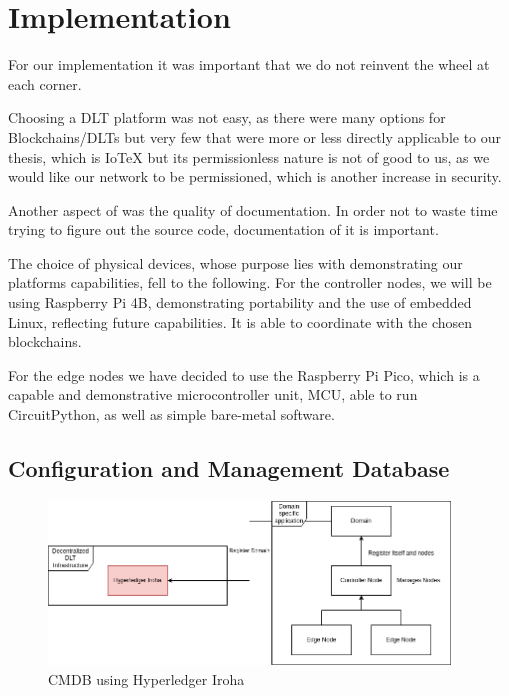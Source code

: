 \chapter{Implementation}

For our implementation it was important that we do not reinvent the wheel at each corner.

Choosing a DLT platform was not easy, as there were many options for Blockchains/DLTs but very few that were more or
less directly applicable to our thesis, which is IoTeX but its permissionless nature is not of good to us, as we would
like our network to be permissioned, which is another increase in security.

Another aspect of was the quality of documentation. In order not to waste time trying to figure out the source code,
documentation of it is important.

The choice of physical devices, whose purpose lies with demonstrating our platforms capabilities, fell to the following.
For the controller nodes, we will be using Raspberry Pi 4B, demonstrating portability and the use of embedded Linux,
reflecting future capabilities. It is able to coordinate with the chosen blockchains.

For the edge nodes we have decided to use the Raspberry Pi Pico, which is a capable and demonstrative microcontroller
unit, MCU, able to run CircuitPython, as well as simple bare-metal software.

\section{Configuration and Management Database} %
\label{sec:Configuration and Management Database}

\begin{figure}
	\begin{center}
		\includegraphics[width=0.95\textwidth]{figures/cmdb-iroha-architecture.png}
	\end{center}
	\caption{CMDB using Hyperledger Iroha}
	\label{fig:cmdb-iroha-architecture}
\end{figure}

